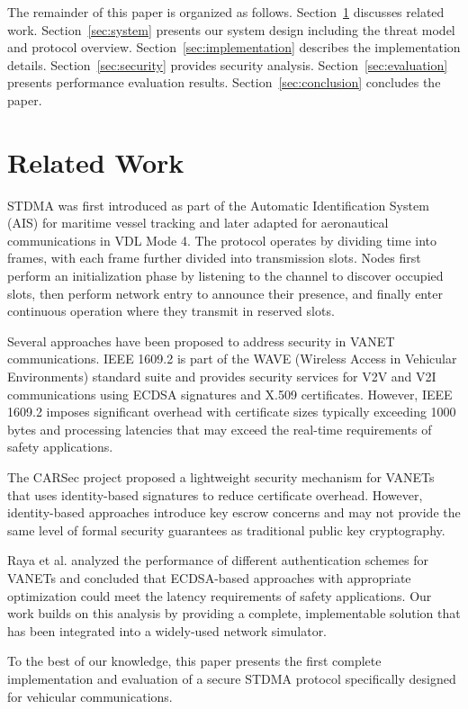 \documentclass[conference]{IEEEtran}
\begin{document}
The remainder of this paper is organized as follows. Section~\ref{sec:related} discusses related work. Section~\ref{sec:system} presents our system design including the threat model and protocol overview. Section~\ref{sec:implementation} describes the implementation details. Section~\ref{sec:security} provides security analysis. Section~\ref{sec:evaluation} presents performance evaluation results. Section~\ref{sec:conclusion} concludes the paper.

\section{Related Work}
\label{sec:related}

STDMA was first introduced as part of the Automatic Identification System (AIS) for maritime vessel tracking and later adapted for aeronautical communications in VDL Mode 4. The protocol operates by dividing time into frames, with each frame further divided into transmission slots. Nodes first perform an initialization phase by listening to the channel to discover occupied slots, then perform network entry to announce their presence, and finally enter continuous operation where they transmit in reserved slots.

Several approaches have been proposed to address security in VANET communications. IEEE 1609.2 is part of the WAVE (Wireless Access in Vehicular Environments) standard suite and provides security services for V2V and V2I communications using ECDSA signatures and X.509 certificates. However, IEEE 1609.2 imposes significant overhead with certificate sizes typically exceeding 1000 bytes and processing latencies that may exceed the real-time requirements of safety applications.

The CARSec project proposed a lightweight security mechanism for VANETs that uses identity-based signatures to reduce certificate overhead. However, identity-based approaches introduce key escrow concerns and may not provide the same level of formal security guarantees as traditional public key cryptography.

Raya et al. analyzed the performance of different authentication schemes for VANETs and concluded that ECDSA-based approaches with appropriate optimization could meet the latency requirements of safety applications. Our work builds on this analysis by providing a complete, implementable solution that has been integrated into a widely-used network simulator.

To the best of our knowledge, this paper presents the first complete implementation and evaluation of a secure STDMA protocol specifically designed for vehicular communications.
\end{document}
